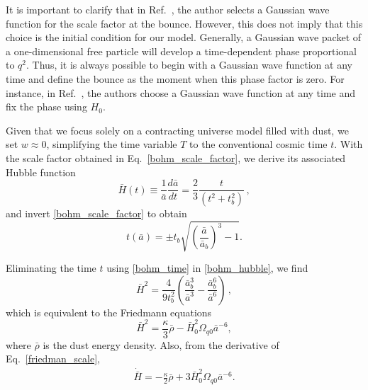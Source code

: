 \documentclass[a4paper,11pt]{article}
\newcommand{\dpar}[1]{\left(#1 \right)}
\begin{document}
It is important to clarify that in Ref.~\cite{nelson2021bouncing}, the author selects a
Gaussian wave function for the scale factor at the bounce. However, this does not imply
that this choice is the initial condition for our model. Generally, a Gaussian wave
packet of a one-dimensional free particle will develop a time-dependent phase
proportional to $q^2$. Thus, it is always possible to begin with a Gaussian wave
function at any time and define the bounce as the moment when this phase factor is zero.
For instance, in Ref.~\cite{Peter2016a}, the authors choose a Gaussian wave function at
any time and fix the phase using $H_0$.

Given that we focus solely on a contracting universe model filled with dust, we set $w
	\approx 0$, simplifying the time variable $T$ to the conventional cosmic time $t$. With
the scale factor obtained in Eq.~\eqref{bohm_scale_factor}, we derive its associated
Hubble function
\begin{equation}\label{bohm_hubble}
	\bar{H}(t) \equiv \frac{1}{\bar{a}}\frac{d\bar{a}}{dt} = \frac{2}{3}\frac{t}{ \dpar{ t^{2} + t^{2}_{b} } }\, ,
\end{equation}
and invert \eqref{bohm_scale_factor} to obtain
\begin{equation}\label{bohm_time}
	t(\bar{a}) = \pm t_{b}\sqrt{ \dpar{\frac{\bar{a}}{\bar{a}_{b}}}^{3} - 1 } .
\end{equation}

Eliminating the time $t$ using \eqref{bohm_time} in \eqref{bohm_hubble}, we find
\begin{equation}
	\label{friedman_scale}
	\bar{H}^{2} = \frac{ 4 }{ 9t^{2}_{b}}\dpar
	{ \frac{ \bar{a}^{3}_{b} }{ \bar{a}^{3} } - \frac{\bar{a}_{b}^{6}}{ \bar{a}^{6} } }\, ,
\end{equation}
which is equivalent to the Friedmann equations
\begin{equation}\label{effective_friedmann}
	\bar{H}^{2} = \frac{\kappa}{ 3 }\bar\rho - \bar{H}^{2}_{0}\Omega_{q0}\bar{a}^{-6},
\end{equation}
where $\bar\rho$ is the dust energy density. Also, from the derivative of
Eq.~\eqref{friedman_scale},
\begin{align}
	\dot{\bar{H}} = - \frac{\kappa}{2} \bar\rho + 3\bar{H}^{2}_{0}\Omega_{q0}\bar{a}^{-6}.
\end{align}
\end{document}
